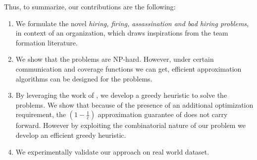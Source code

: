 Thus, to summarize, our contributions are the following:

\begin{enumerate}
\item We formulate the novel \textit{hiring, firing, assassination and bad hiring problems}, in context of an organization, which draws inspirations from the team formation literature.

\item We show that the problems are NP-hard. However, under certain communication and coverage functions we can get, efficient approximation algorithms can be designed for the problems.

\item By leveraging the work of \cite{bai2016algorithms}, we develop a greedy heuristic to solve the problems. We show that because of the presence of an additional optimization requirement, the $(1 - \frac{1}{e})$ approximation guarantee of \cite{bai2016algorithms} does not carry forward. However by exploiting the combinatorial nature of our problem we develop an efficient greedy heuristic.

\item We experimentally validate our approach on real world dataset. 

\end{enumerate}